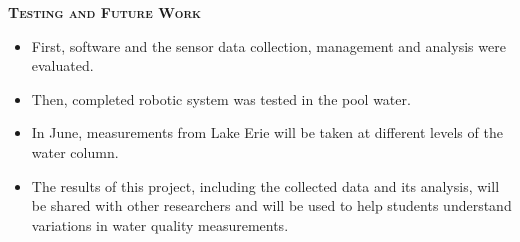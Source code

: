 \documentclass[final,t]{beamer}
\begin{document}
\begin{frame}{}
\begin{columns}
\begin{column}{.33\linewidth}
                \begin{alertblock}{\textsc{\textbf{Testing and Future Work}}}
                    \vspace*{3mm}
                    \begin{itemize}
                    	\item First, software and the sensor data collection,
                      management and analysis were evaluated.
                    	\item Then, completed robotic system was tested in the pool
                      water.
                    	\item In June, measurements from Lake Erie will be taken at
                      different levels of the water column.
                    	\item The results of this project, including the collected
                      data and its analysis, will be shared with other researchers
                      and will be used to help students understand variations in
                      water quality measurements.
                    \end{itemize}

                    \vspace*{3mm}
                \end{alertblock}
            \end{column}

        \end{columns}
    \end{frame}
\end{document}
